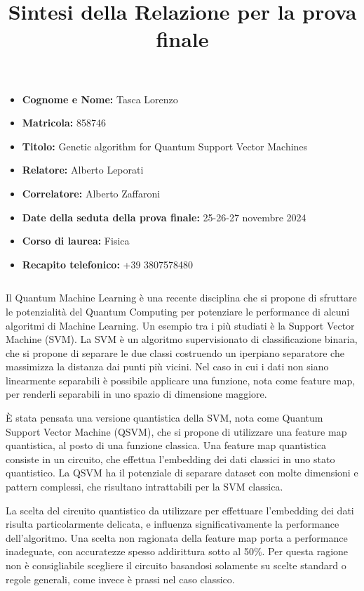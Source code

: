 \documentclass{article}
\title{Sintesi della Relazione per la prova finale}
\date{}
\author{}
\begin{document}


\begin{itemize}
   \item \textbf{Cognome e Nome:} Tasca Lorenzo
    \item \textbf{Matricola:} 858746
    \item \textbf{Titolo:} Genetic algorithm for Quantum Support Vector Machines    \item \textbf{Relatore:} Alberto Leporati
    \item \textbf{Correlatore:} Alberto Zaffaroni
    \item \textbf{Date della seduta della prova finale:} 25-26-27 novembre 2024 
  \item \textbf{Corso di laurea:} Fisica
    \item \textbf{Recapito telefonico:} +39 3807578480
    
\end{itemize}

$\,$

Il Quantum Machine Learning è una recente disciplina che si propone di sfruttare le potenzialità del Quantum Computing per potenziare le performance di alcuni algoritmi di Machine Learning. Un esempio tra i più studiati è la Support Vector Machine (SVM). La SVM è un algoritmo supervisionato di classificazione binaria, che si propone di separare le due classi costruendo un iperpiano separatore che massimizza la distanza dai punti più vicini. Nel caso in cui i dati non siano linearmente separabili è possibile applicare una funzione, nota come feature map, per renderli separabili in uno spazio di dimensione maggiore. 

È stata pensata una versione quantistica della SVM, nota come Quantum Support Vector Machine (QSVM), che si propone di utilizzare una feature map quantistica, al posto di una funzione classica. Una feature map quantistica consiste in un circuito, che effettua l'embedding dei dati classici in uno stato quantistico. La QSVM ha il potenziale di separare dataset con molte dimensioni e pattern complessi, che risultano intrattabili per la SVM classica. 

La scelta del circuito quantistico da utilizzare per effettuare l'embedding dei dati risulta particolarmente delicata, e influenza significativamente la performance dell'algoritmo. Una scelta non ragionata della feature map porta a performance inadeguate, con accuratezze spesso addirittura sotto al 50\%. Per questa ragione non è consigliabile scegliere il circuito basandosi solamente su scelte standard o regole generali, come invece è prassi nel caso classico.
\end{document}
